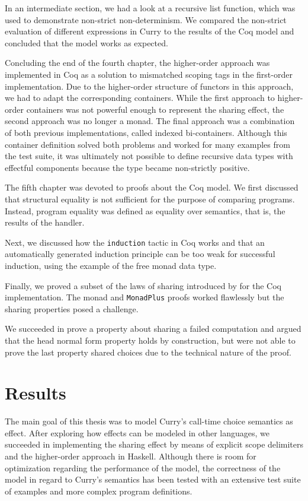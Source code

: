 \documentclass[a4paper, 11pt, fleqn, twoside, abstract=on]{scrreprt}
\newcommand{\hinl}[1]{\texttt{#1}}
\newcommand{\cinl}[1]{\texttt{#1}}
\begin{document}
In an intermediate section, we had a look at a recursive list function, which was used to demonstrate non-strict non-determinism.
We compared the non-strict evaluation of different expressions in Curry to the results of the Coq model and concluded that the model works as expected.

Concluding the end of the fourth chapter, the higher-order approach was implemented in Coq as a solution to mismatched scoping tags in the first-order implementation.
Due to the higher-order structure of functors in this approach, we had to adapt the corresponding containers.
While the first approach to higher-order containers was not powerful enough to represent the sharing effect, the second approach was no longer a monad.
The final approach was a combination of both previous implementations, called indexed bi-containers.
Although this container definition solved both problems and worked for many examples from the test suite, it was ultimately not possible to define recursive data types with effectful components because the type became non-strictly positive.

The fifth chapter was devoted to proofs about the Coq model.
We first discussed that structural equality is not sufficient for the purpose of comparing programs.
Instead, program equality was defined as equality over semantics, that is, the results of the handler.

Next, we discussed how the \cinl{induction} tactic in Coq works and that an automatically generated induction principle can be too weak for successful induction, using the example of the free monad data type.

Finally, we proved a subset of the laws of sharing introduced by \citet{fischer2009purely} for the Coq implementation.
The monad and \hinl{MonadPlus} proofs worked flawlessly but the sharing properties posed a challenge.

We succeeded in prove a property about sharing a failed computation and argued that the head normal form property holds by construction, but were not able to prove the last property shared choices due to the technical nature of the proof.

\section{Results}
The main goal of this thesis was to model Curry's call-time choice semantics as effect.
After exploring how effects can be modeled in other languages, we succeeded in implementing the sharing effect by means of explicit scope delimiters and the higher-order approach in Haskell.
Although there is room for optimization regarding the performance of the model, the correctness of the model in regard to Curry's semantics has been tested with an extensive test suite of examples and more complex program definitions.
\end{document}
